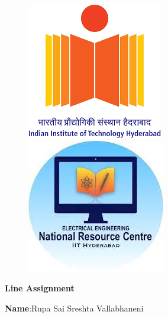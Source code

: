 \documentclass[10pt,a4paper]{report}
\begin{document}
\begin{figure}[!tbp]
  \centering
  \begin{minipage}[b]{0.4\textwidth}
   \includegraphics[scale=0.5]{iithlogo.png} 
  \end{minipage}
  \hfill
  \vspace{5mm}\begin{minipage}[b]{0.4\textwidth}
\raggedleft \includegraphics[scale=0.5]{nrc.jpeg} 

  \end{minipage}\vspace{0.2cm}
\end{figure}
\raggedright 

\begin{center}
\Large \textbf{Line Assignment}\hspace{2.5cm} %
\end{center}
\begin{center}
\textbf{Name}:\hspace{1mm}Rupa Sai Sreshta Vallabhaneni\hspace{3cm}
\end{center}
  
\end{document}
